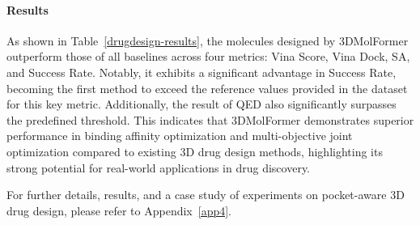 \paragraph{Results}
As shown in Table~\ref{drugdesign-results}, the molecules designed by 3DMolFormer outperform those of all baselines across four metrics: Vina Score, Vina Dock, SA, and Success Rate. Notably, it exhibits a significant advantage in Success Rate, becoming the first method to exceed the reference values provided in the dataset for this key metric. Additionally, the result of QED also significantly surpasses the predefined threshold. This indicates that 3DMolFormer demonstrates superior performance in binding affinity optimization and multi-objective joint optimization compared to existing 3D drug design methods, highlighting its strong potential for real-world applications in drug discovery.

For further details, results, and a case study of experiments on pocket-aware 3D drug design, please refer to Appendix~\ref{app4}.